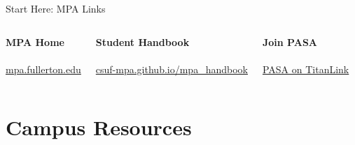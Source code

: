 \documentclass[10pt,aspectratio=169]{beamer}
\begin{document}
\begin{frame}{Start Here: MPA Links}
\centering
\begin{columns}[T,onlytextwidth]
    \centering
    \textbf{MPA Home}\\[6pt]
    \\[6pt]
    \scriptsize\href{https://mpa.fullerton.edu}{mpa.fullerton.edu}

    \centering
    \textbf{Student Handbook}\\[6pt]
    \\[6pt]
    \scriptsize\href{https://csuf-mpa.github.io/mpa_handbook/}{csuf-mpa.github.io/mpa\_handbook}

    \centering
    \textbf{Join PASA}\\[6pt]
    \\[6pt]
    \scriptsize\href{https://fullerton.campuslabs.com/engage/organization/pasa}{PASA on TitanLink}
\end{columns}
\end{frame}

\section{\textcolor{titanorange}{Campus Resources}}
\end{document}
